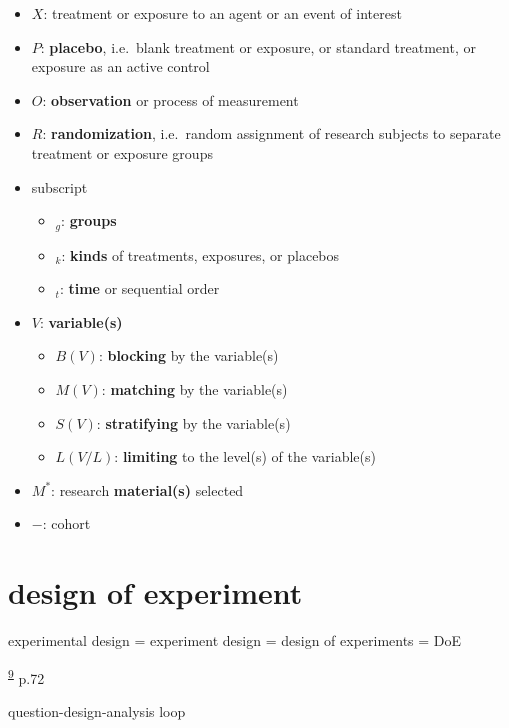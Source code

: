 \documentclass[
]{book}
\providecommand{\tightlist}{%
  \setlength{\itemsep}{0pt}\setlength{\parskip}{0pt}}
\theoremstyle{definition}
\theoremstyle{definition}
\theoremstyle{definition}
\theoremstyle{definition}
\theoremstyle{remark}
\begin{document}
\begin{itemize}
\tightlist
\item
  \(X\): treatment or exposure to an agent or an event of interest
\item
  \(P\): \textbf{placebo}, i.e.~blank treatment or exposure, or standard treatment, or exposure as an active control
\item
  \(O\): \textbf{observation} or process of measurement
\item
  \(R\): \textbf{randomization}, i.e.~random assignment of research subjects to separate treatment or exposure groups
\item
  subscript

  \begin{itemize}
  \tightlist
  \item
    \(_g\): \textbf{groups}
  \item
    \(_k\): \textbf{kinds} of treatments, exposures, or placebos
  \item
    \(_t\): \textbf{time} or sequential order
  \end{itemize}
\item
  \(V\): \textbf{variable(s)}

  \begin{itemize}
  \tightlist
  \item
    \(B(V)\): \textbf{blocking} by the variable(s)
  \item
    \(M(V)\): \textbf{matching} by the variable(s)
  \item
    \(S(V)\): \textbf{stratifying} by the variable(s)
  \item
    \(L(V/L)\): \textbf{limiting} to the level(s) of the variable(s)
  \end{itemize}
\item
  \(M^{*}\): research \textbf{material(s)} selected
\item
  \(-\): cohort
\end{itemize}

\hypertarget{design-of-experiment}{%
\chapter{design of experiment}\label{design-of-experiment}}

experimental design = experiment design = design of experiments = DoE

\textsuperscript{\protect\hyperlink{ref-hu2022}{9}} p.72

question-design-analysis loop
\end{document}
